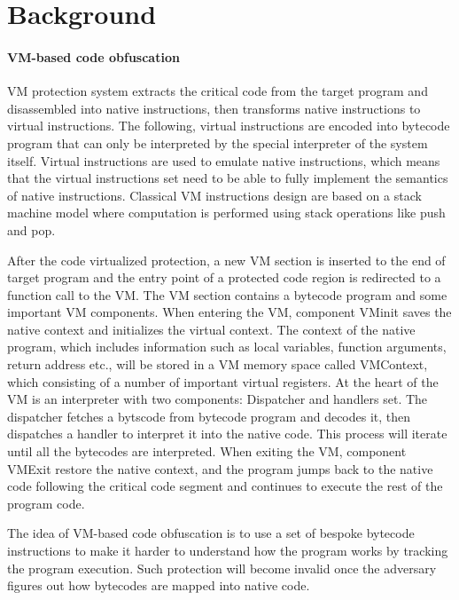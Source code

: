 \section{Background}\label{sec:bak}

\paragraph*{VM-based code obfuscation}
VM protection system extracts the critical code from the target program and disassembled
into native instructions, then transforms native instructions to virtual instructions.
The following, virtual instructions are encoded into bytecode program that can only be interpreted by
the special interpreter of the system itself. Virtual instructions are used to emulate native instructions,
which means that the virtual instructions set need to be able to fully implement the semantics of native instructions.
Classical VM instructions design are based on a stack machine model
where computation is performed using stack operations like push and pop.


After the code virtualized protection, a new VM section is inserted to the end of target program and the
entry point of a protected code region is redirected to a function call to the VM.
The VM section contains a bytecode program and some important VM components.
When entering the VM, component VMinit saves the native context and initializes the virtual context.
The context of the native program, which includes information such as local variables, function arguments, return address etc.,
will be stored in a VM memory space called VMContext, which consisting of a number of important virtual registers.
At the heart of the VM is an interpreter with two components: Dispatcher and handlers set.
The dispatcher fetches a bytscode from bytecode program and decodes it, then dispatches a handler to interpret it into the native code.
This process will iterate until all the bytecodes are interpreted. When exiting the VM, component VMExit restore the native context,
and the program jumps back to the native code following the critical code segment and continues to execute the rest of the program code.

The idea of VM-based code obfuscation is to use a set of bespoke bytecode instructions to
make it harder to understand how the program works by tracking the program execution.
Such protection will become invalid once the adversary figures out how bytecodes are mapped into native code.

